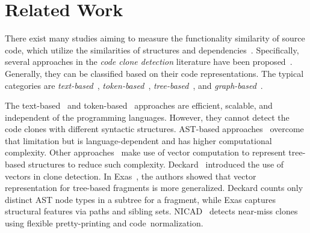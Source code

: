 \section{Related Work}

There exist many studies aiming to measure the functionality
similarity of source code, which utilize the similarities of
structures and 
dependencies~\cite{clone-tse07,roy09,baker97,ccfinder,cpminer,deckard,deckard2,horwitz01,baxter98}.
Specifically, several approaches in the {\em code clone detection}
literature have been proposed~\cite{clone-tse07,roy09}. Generally,
they can be classified based on their code representations. The
typical categories are {\em text-based}~\cite{ducasse-icsm99}, {\em
  token-based}~\cite{baker97,ccfinder,cpminer,mende08}, {\em
  tree-based}~\cite{baxter98,deckard}, and
{\em graph-based}~\cite{deckard2,horwitz01,liu06}.

The text-based~\cite{ducasse-icsm99} and token-based~\cite{ccfinder}
approaches are efficient, scalable, and independent of the programming
languages. However, they cannot detect the code clones with different
syntactic structures. AST-based approaches~\cite{baxter98} overcome
that limitation but is language-dependent and has higher computational
complexity. Other approaches~\cite{fase09,deckard} make use of vector
computation to represent tree-based structures to reduce such
complexity.  Deckard~\cite{deckard} introduced the use of vectors in
clone detection. In Exas~\cite{fase09}, the authors showed that vector
representation for tree-based fragments is more generalized. Deckard
counts only distinct AST node types in a subtree for a fragment, while
Exas captures structural features via paths and sibling sets.
%
NICAD~\cite{nicad08} detects near-miss clones using flexible
pretty-printing and code~normalization.

